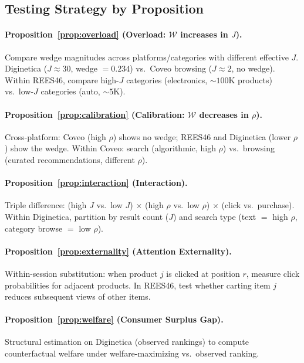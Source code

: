 \documentclass[12pt]{article}
\begin{document}
\subsection{Testing Strategy by Proposition}

\paragraph{Proposition~\ref{prop:overload} (Overload: $\mathcal{W}$ increases in $J$).}
Compare wedge magnitudes across platforms/categories with different effective $J$. Diginetica ($J \approx 30$, wedge $= 0.234$) vs.\ Coveo browsing ($J \approx 2$, no wedge). Within REES46, compare high-$J$ categories (electronics, ${\sim}100$K products) vs.\ low-$J$ categories (auto, ${\sim}5$K).

\paragraph{Proposition~\ref{prop:calibration} (Calibration: $\mathcal{W}$ decreases in $\rho$).}
Cross-platform: Coveo (high $\rho$) shows no wedge; REES46 and Diginetica (lower $\rho$) show the wedge. Within Coveo: search (algorithmic, high $\rho$) vs.\ browsing (curated recommendations, different $\rho$).

\paragraph{Proposition~\ref{prop:interaction} (Interaction).}
Triple difference: (high $J$ vs.\ low $J$) $\times$ (high $\rho$ vs.\ low $\rho$) $\times$ (click vs.\ purchase). Within Diginetica, partition by result count ($J$) and search type (text $=$ high $\rho$, category browse $=$ low $\rho$).

\paragraph{Proposition~\ref{prop:externality} (Attention Externality).}
Within-session substitution: when product $j$ is clicked at position $r$, measure click probabilities for adjacent products. In REES46, test whether carting item $j$ reduces subsequent views of other items.

\paragraph{Proposition~\ref{prop:welfare} (Consumer Surplus Gap).}
Structural estimation on Diginetica (observed rankings) to compute counterfactual welfare under welfare-maximizing vs.\ observed ranking.
\end{document}
